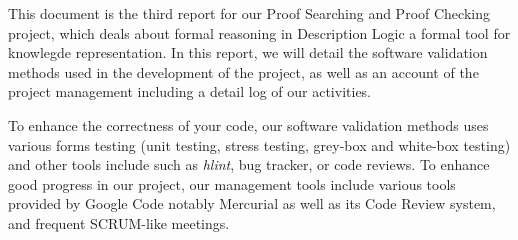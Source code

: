 This document is the third report for our Proof Searching and Proof
Checking project, which deals about formal reasoning in Description
Logic a formal tool for knowlegde representation. In this report, we
will detail the software validation methods used in the development of
the project, as well as an account of the project management including
a detail log of our activities.

To enhance the correctness of your code, our software validation
methods uses various forms testing (unit testing, stress testing,
grey-box and white-box testing) and other tools include such
as \emph{hlint}, bug tracker, or code reviews. To enhance good
progress in our project, our management tools include various tools
provided by Google Code notably Mercurial as well as its Code Review
system, and frequent SCRUM-like meetings.

